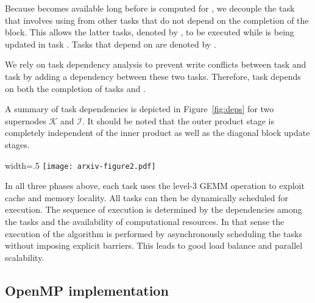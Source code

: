 \documentclass[10pt, conference, compsocconf,letterpaper,twocolumn]{IEEEtran}
\newcommand{\IS}{\ensuremath{\mathcal I}\xspace}
\newcommand{\KS}{\ensuremath{\mathcal K}\xspace}
\begin{document}
Because  becomes available long before  
is computed for , we decouple
the task that involves using  from other tasks that do 
not depend on the completion of the  block. 
This allows the latter tasks, denoted by , to be executed while  is being updated in
task . 
Tasks that depend on 
are denoted by .


We rely on task dependency analysis to prevent write conflicts between
task  and task  by adding a dependency between these two tasks. Therefore, task  depends on both the completion of tasks  and .


A summary of task dependencies is depicted in Figure~\ref{fig:deps} for two supernodes \KS and \IS.
It should be noted that the outer product stage is completely independent of the inner product as well as the diagonal block update stages.  
 
\begin{figure*}[htbp]
\centering
\begin{adjustbox}{width=.5\linewidth}
\texttt{[image: arxiv-figure2.pdf]}
\end{adjustbox}
\caption{Task dependencies for supernode \KS. \IS is the next supernode that will be processed.\label{fig:deps}}
\end{figure*}











In all three phases above, each task uses the level-3 \textsf{GEMM}  operation  to exploit cache and memory locality. All tasks can then be dynamically scheduled for execution. The sequence of execution is determined by the dependencies among the tasks and the availability of computational resources. In that sense  the execution of the algorithm is performed by asynchronously scheduling the tasks without imposing explicit barriers. This leads to good load balance and parallel scalability. 



\subsection{OpenMP implementation}
\end{document}
